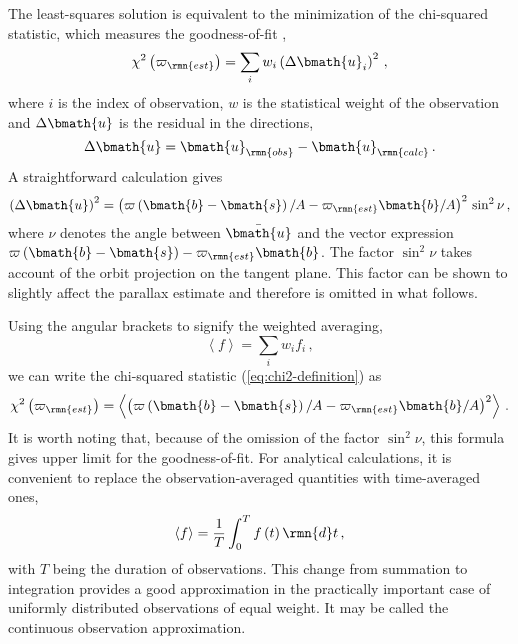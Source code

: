 \documentclass[fleqn,usenatbib,useAMS,usedcolumn]{mnras}
\begin{document}
The least-squares solution is equivalent to the minimization of the chi-squared statistic, which measures the goodness-of-fit \citep[see, for example,][]{brandt,bevington+robinson},
\begin{equation}\label{eq:chi2-definition}
  \chi^2\left(\varpi_\rmn{est}\right)=\sum_iw_i\left(\Delta\bmath{u}_i\right)^2\,,
\end{equation}
where $i$ is the index of observation, $w$ is the statistical weight of the observation and $\Delta\bmath{u}$ is the residual in the directions,
\begin{equation}
  \Delta\bmath{u}=\bmath{u}_\rmn{obs}-\bmath{u}_\rmn{calc}\,.
\end{equation}
A straightforward calculation gives
\begin{equation}
  \left(\Delta\bmath{u}\right)^2=
  \left(
   \varpi\left(\bmath{b}-\bmath{s}\right)/A-\varpi_\rmn{est}\bmath{b}/A
  \right)^2\,
  \sin^2\nu\,,
\end{equation}
where $\nu$ denotes the angle between $\bar{\bmath{u}}$ and the vector expression $\varpi\left(\bmath{b}-\bmath{s}\right)-\varpi_\rmn{est}\bmath{b}$. The factor $\sin^2\nu$ takes account of the orbit projection on the tangent plane. This factor can be shown to slightly affect the parallax estimate and therefore is omitted in what follows.

Using the angular brackets to signify the weighted averaging,
\begin{equation}
 \left\langle f\right\rangle=
 \sum_iw_if_i\,,
\end{equation}
we can write the chi-squared statistic (\ref{eq:chi2-definition}) as
\begin{equation}\label{eq:chi2}
  \chi^2\left(\varpi_\rmn{est}\right)=
  \left\langle\left(\varpi\left(\bmath{b}-\bmath{s}\right)/A-\varpi_\rmn{est}\bmath{b}/A\right)^2\right\rangle\,.
\end{equation}
It is worth noting that, because of the omission of the factor $\sin^2\nu$, this formula gives upper limit for the goodness-of-fit. For analytical calculations, it is convenient to replace the observation-averaged quantities with time-averaged ones,
\begin{equation}\label{eq:time-average}
 \left\langle f\right\rangle=
 \frac{1}{T}\int_0^Tf\left(t\right)\rmn{d}t\,,
\end{equation}
with $T$ being the duration of observations. This change from summation to integration provides a good approximation in the practically important case of uniformly distributed observations of equal weight. It may be called the continuous observation approximation.
\end{document}
